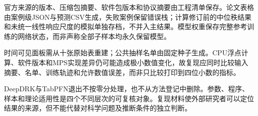 \documentclass{sufethesismas}
\begin{document}
官方来源的版本、压缩包摘要、软件包版本和协议摘要由工程清单保存。论文表格由案例级JSON与预测CSV生成，失败案例保留错误栈；计算修订前的中位秩结果和未统一线性响应尺度的模拟单独存档，不并入主结果。模型权重保存完整参考训练的网络状态，而非声称全部子样本均永久保留模型。

时间可见面板需从十张原始表重建；公共抽样名单由固定种子生成。CPU浮点计算、软件版本和MPS实现差异仍可能造成极小数值变化，故复现应同时比较输入摘要、名单、训练轨迹和允许数值误差，而非只比较打印到四位小数的指标。

DeepDRK与TabPFN退出不按零分处理，也不从方法登记中删除。参数、程序、样本和理论适用性是四个不同层次的可复核对象。复现材料使外部研究者可以定位结果的来源，但不能代替对科学问题及推断条件的独立判断。
\end{document}
